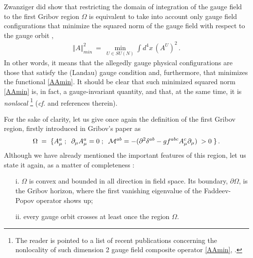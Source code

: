 Zwanziger did show that restricting the domain of integration of the gauge field to the first
Gribov region $\Omega$ is equivalent to take into account only gauge field configurations
that minimize the squared norm of the gauge field with respect to the gauge orbit
\cite{Zwanziger:1982na,Zwanziger:1988jt},
\begin{eqnarray}
 \left\Vert A\right\Vert^{2}_{min} ~=~ \min_{U\in SU(N)}\int d^{4}x \,
\left(A^{U}\right)^{2}\,.
\label{AAmin}
\end{eqnarray}
In other words, it means that the allegedly gauge physical configurations are those
that satisfy the (Landau) gauge condition and, furthermore, that minimizes the functional
\eqref{AAmin}. It should be clear that such minimized squared norm \eqref{AAmin} is, in 
fact, a gauge-invariant quantity, and that, at the same time, it is {\it nonlocal}
\footnote{The reader is pointed to a list of recent publications concerning the nonlocality of
such dimension 2 gauge field composite operator \eqref{AAmin},
\cite{Capri:2015pja,Capri:2015nzw,Capri:2016aqq,Fiorentini:2016rwx,Dudal:2006xd}.} (\emph{cf.}
\cite{Vandersickel:2012tz,Zwanziger:1982na,Zwanziger:1988jt,Zwanziger:1989mf,Zwanziger:1990tn,
Zwanziger:1992qr} and references therein).

For the sake of clarity, let us give once again the definition of the first Gribov region,
firstly introduced in Gribov's paper \cite{Gribov:1977wm} as
\begin{align}
\Omega \;= \; \{ A^a_{\mu}\;; \;\; \partial_\mu A^a_{\mu}=0\;; \;\; {\cal M}^{ab}=-(\partial^2
\delta^{ab} -g f^{abc}A^{c}_{\mu}\partial_{\mu})\; >0 \; \} \,.
\label{gr}
\end{align} 
Although we have already mentioned the important features of this region, let us state it
again, as a matter of completeness \cite{Vandersickel:2012tz,Zwanziger:1982na,Zwanziger:1988jt,Zwanziger:1989mf,Dell'Antonio:1989jn,Dell'Antonio:1991xt}:
\begin{itemize}
	\item[i.] $\Omega$  is convex and bounded in all direction in field space. Its
boundary, $\partial \Omega$, is the Gribov horizon, where the first vanishing eigenvalue of the
Faddeev-Popov operator shows up;
	\item[ii.] every gauge orbit crosses at least once the region $\Omega$. 
\end{itemize} 

